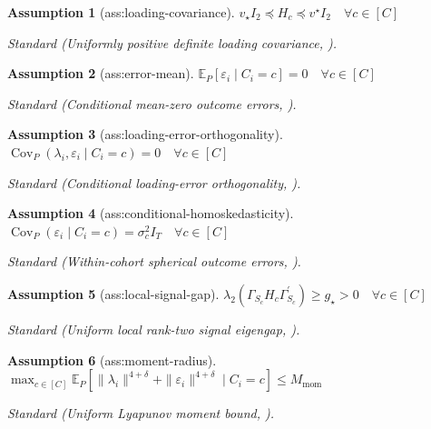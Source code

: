 \documentclass{article}
\newtheorem{assumption}{Assumption}
\begin{document}
\begin{assumption}[ass:loading-covariance]\label{ass:loading-covariance}
\(v_{\star}I_2\preceq H_c\preceq v^{\star}I_2\quad\forall c\in[C]\)
\par\smallskip\noindent\emph{Standard} (Uniformly positive definite loading covariance, \cite{LeiRoss2023}).
\end{assumption}

\begin{assumption}[ass:error-mean]\label{ass:error-mean}
\(\mathbb E_P[\varepsilon_i\mid C_i=c]=0\quad\forall c\in[C]\)
\par\smallskip\noindent\emph{Standard} (Conditional mean-zero outcome errors, \cite{LeiRoss2023}).
\end{assumption}

\begin{assumption}[ass:loading-error-orthogonality]\label{ass:loading-error-orthogonality}
\(\operatorname{Cov}_P(\lambda_i,\varepsilon_i\mid C_i=c)=0\quad\forall c\in[C]\)
\par\smallskip\noindent\emph{Standard} (Conditional loading-error orthogonality, \cite{LeiRoss2023}).
\end{assumption}

\begin{assumption}[ass:conditional-homoskedasticity]\label{ass:conditional-homoskedasticity}
\(\operatorname{Cov}_P(\varepsilon_i\mid C_i=c)=\sigma_c^2I_T\quad\forall c\in[C]\)
\par\smallskip\noindent\emph{Standard} (Within-cohort spherical outcome errors, \cite{LeiRoss2023}).
\end{assumption}

\begin{assumption}[ass:local-signal-gap]\label{ass:local-signal-gap}
\(\lambda_2(\Gamma_{S_c}H_c\Gamma_{S_c}^{\prime})\ge g_{\star}>0\quad\forall c\in[C]\)
\par\smallskip\noindent\emph{Standard} (Uniform local rank-two signal eigengap, \cite{LeiRoss2023}).
\end{assumption}

\begin{assumption}[ass:moment-radius]\label{ass:moment-radius}
\(\max_{c\in[C]}\mathbb E_P[\|\lambda_i\|^{4+\delta}+\|\varepsilon_i\|^{4+\delta}\mid C_i=c]\le M_{\mathrm{mom}}\)
\par\smallskip\noindent\emph{Standard} (Uniform Lyapunov moment bound, \cite{vanDerVaart1998}).
\end{assumption}
\end{document}
